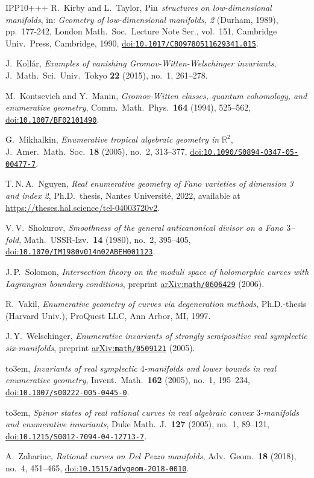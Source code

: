 \documentclass[10pt,a4paper]{article}
\numberwithin{equation}{section}
\newcommand{\doi}[1]{\href{https://doi.org/#1}{doi:\nolinkurl{#1}}}
\newcommand{\arXiv}[1]{\href{https://arxiv.org/abs/#1}{arXiv:\nolinkurl{#1}}}
\providecommand{\bysame}{\leavevmode\hbox to3em{\hrulefill}\thinspace}
\theoremstyle{definition}
\theoremstyle{plain}
\theoremstyle{remark}
\begin{document}
\begin{thebibliography}{IPP{\etalchar{+}}10+++}
R.~Kirby and L.~Taylor, \emph{${\rm Pin}$ structures on low-dimensional manifolds}, in: \emph{Geometry of low-dimensional manifolds, 2} ({D}urham, 1989), pp.~177-242, London Math.\ Soc.\ Lecture Note Ser., vol.~151, Cambridge Univ.\ Press, Cambridge, 1990, \doi{10.1017/CBO9780511629341.015}.

J.~Koll\'{a}r, \emph{Examples of vanishing {G}romov-{W}itten-{W}elschinger
  invariants}, J.~Math.\ Sci.\ Univ.\ Tokyo \textbf{22} (2015), no.~1, 261--278.

M.~Kontsevich and Y.~Manin, \emph{Gromov-{W}itten classes, quantum cohomology,
  and enumerative geometry}, Comm.\ Math.\ Phys.\ \textbf{164} (1994), 525--562,
\doi{10.1007/BF02101490}.

G.~Mikhalkin, \emph{Enumerative tropical algebraic geometry in $\mathbb{R}^2$},
  J.~Amer.\ Math.\ Soc.\ \textbf{18} (2005), no.~2, 313--377, 
\doi{10.1090/S0894-0347-05-00477-7}.

  T.\,N.\,A.~Nguyen, \emph{Real enumerative geometry of {F}ano varieties of dimension 3 and index 2}, Ph.D.~thesis, Nantes Universit{\'e}, 2022, available at \url{https://theses.hal.science/tel-04003720v2}.

V.\,V.~Shokurov, \emph{Smoothness of the general anticanonical divisor on a
  {F}ano $3$--fold}, Math.\ USSR-Izv.\ \textbf{14} (1980),
  no.~2, 395--405, 
\doi{10.1070/IM1980v014n02ABEH001123}.

J.\,P.~Solomon, \emph{Intersection theory on the moduli space of holomorphic
  curves with Lagrangian boundary conditions}, preprint \arXiv{math/0606429}
  (2006).

R.~Vakil, \emph{Enumerative geometry of curves via degeneration methods},
Ph.D.-thesis (Harvard Univ.), ProQuest LLC, Ann Arbor, MI, 1997.

J.\,Y.~Welschinger, \emph{Enumerative invariants of strongly semipositive real
  symplectic six-manifolds}, preprint \arXiv{math/0509121} (2005).

\bysame, \emph{Invariants of real symplectic $4$-manifolds and lower bounds in
  real enumerative geometry}, Invent.\ Math.\ \textbf{162} (2005),
  no.~1, 195--234, 
\doi{10.1007/s00222-005-0445-0}.

\bysame, \emph{Spinor states of real rational curves in real algebraic convex
  $3$-manifolds and enumerative invariants}, Duke Math.~J.\
  \textbf{127} (2005), no.~1, 89--121, 
\doi{10.1215/S0012-7094-04-12713-7}.

A.~Zahariuc, \emph{Rational curves on {D}el {P}ezzo manifolds}, Adv.\
Geom.\ \textbf{18} (2018), no.~4, 451--465, 
\doi{10.1515/advgeom-2018-0010}.

\end{thebibliography}
\end{document}
